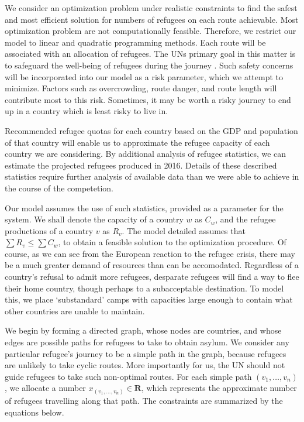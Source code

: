 \documentclass{article}
\begin{document}
\begin{enumerate}
We consider an optimization problem under realistic constraints to find the safest and most efficient solution for numbers of refugees on each route achievable. Most optimization problem are not computationally feasible. Therefore, we restrict our model to linear and quadratic programming methods. Each route will be associated with an allocation of refugees. The UNs primary goal in this matter is to safeguard the well-being of refugees during the journey \cite{UNStatement}. Such safety concerns will be incorporated into our model as a risk parameter, which we attempt to minimize. Factors such as overcrowding, route danger, and route length will contribute most to this risk. Sometimes, it may be worth a risky journey to end up in a country which is least risky to live in.

Recommended refugee quotas for each country based on the GDP and population of that country will enable us to approximate the refugee capacity of each country we are considering. By additional analysis of refugee statistics, we can estimate the projected refugees produced in 2016. Details of these described statistics require further analysis of available data than we were able to achieve in the course of the competetion.

Our model assumes the use of such statistics, provided as a parameter for the system. We shall denote the capacity of a country $w$ as $C_w$, and the refugee productions of a country $v$ as $R_v$. The model detailed assumes that $\sum R_v \leq \sum C_w$, to obtain a feasible solution to the optimization procedure. Of course, as we can see from the European reaction to the refugee crisis, there may be a much greater demand of resources than can be accomodated. Regardless of a country's refusal to admit more refugees, desparate refugees will find a way to flee their home country, though perhaps to a subacceptable destination. To model this, we place `substandard' camps with capacities large enough to contain what other countries are unable to maintain.

We begin by forming a directed graph, whose nodes are countries, and whose edges are possible paths for refugees to take to obtain asylum. We consider any particular refugee's journey to be a simple path in the graph, because refugees are unlikely to take cyclic routes. More importantly for us, the UN should not guide refugees to take such non-optimal routes. For each simple path $(v_1, \dots, v_n)$, we allocate a number $x_{(v_1, \dots, v_n)} \in \mathbf{R}$, which represents the approximate number of refugees travelling along that path. The constraints are summarized by the equations below.


\end{enumerate}
\end{document}
